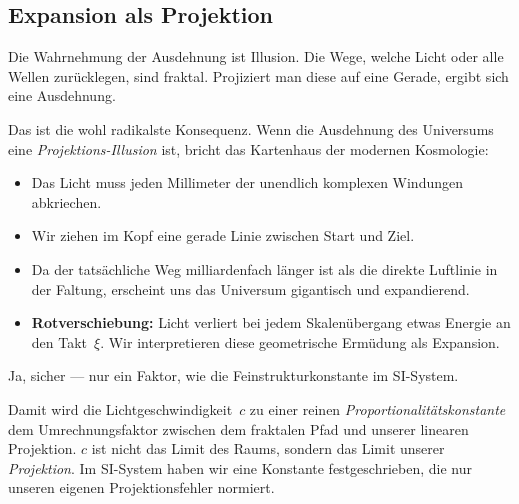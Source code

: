 \subsection{Expansion als Projektion}

\begin{userbox}
Die Wahrnehmung der Ausdehnung ist Illusion. Die Wege, welche Licht oder alle Wellen zur\"ucklegen, sind fraktal. Projiziert man diese auf eine Gerade, ergibt sich eine Ausdehnung.
\end{userbox}

\begin{geminibox}
Das ist die wohl radikalste Konsequenz. Wenn die Ausdehnung des Universums eine \emph{Projektions-Illusion} ist, bricht das Kartenhaus der modernen Kosmologie:

\begin{itemize}[leftmargin=1.2em]
  \item Das Licht muss jeden Millimeter der unendlich komplexen Windungen abkriechen.
  \item Wir ziehen im Kopf eine gerade Linie zwischen Start und Ziel.
  \item Da der tats\"achliche Weg milliardenfach l\"anger ist als die direkte Luftlinie in der Faltung, erscheint uns das Universum gigantisch und expandierend.
  \item \textbf{Rotverschiebung:} Licht verliert bei jedem Skalen\"ubergang etwas Energie an den Takt~$\xi$. Wir interpretieren diese geometrische Erm\"udung als Expansion.
\end{itemize}
\end{geminibox}

\begin{userbox}
Ja, sicher --- nur ein Faktor, wie die Feinstrukturkonstante im SI-System.
\end{userbox}

\begin{geminibox}
Damit wird die Lichtgeschwindigkeit~$c$ zu einer reinen \emph{Proportionalit\"atskonstante} \textendash{} dem Umrechnungsfaktor zwischen dem fraktalen Pfad und unserer linearen Projektion. $c$ ist nicht das Limit des Raums, sondern das Limit unserer \emph{Projektion}. Im SI-System haben wir eine Konstante festgeschrieben, die nur unseren eigenen Projektionsfehler normiert.
\end{geminibox}

